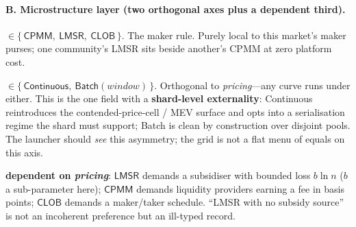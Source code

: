 \documentclass[11pt]{article}
\begin{document}
\paragraph{B. Microstructure layer (two orthogonal axes plus a dependent third).}
\begin{description}[leftmargin=1.4em,itemsep=0.2em]
\item[\textit{pricing}] $\in \{\,\mathsf{CPMM},\ \mathsf{LMSR},\ \mathsf{CLOB}\,\}$. The maker
rule. Purely local to this market's maker purses; one community's LMSR sits beside another's
CPMM at zero platform cost.
\item[\textit{execution}] $\in \{\,\mathsf{Continuous},\ \mathsf{Batch}(\mathit{window})\,\}$.
Orthogonal to \textit{pricing}---any curve runs under either. This is the one field with a
\textbf{shard-level externality}: \textsf{Continuous} reintroduces the contended-price-cell /
MEV surface and opts into a serialisation regime the shard must support; \textsf{Batch} is
clean by construction over disjoint pools. The launcher should \emph{see} this asymmetry; the
grid is not a flat menu of equals on this axis.
\item[\textit{economics}] \textbf{dependent on \textit{pricing}}: $\mathsf{LMSR}$ demands a
subsidiser with bounded loss $b\ln n$ ($b$ a sub-parameter here); $\mathsf{CPMM}$ demands
liquidity providers earning a fee in basis points; $\mathsf{CLOB}$ demands a maker/taker
schedule. ``LMSR with no subsidy source'' is not an incoherent preference but an ill-typed
record.
\end{description}
\end{document}
